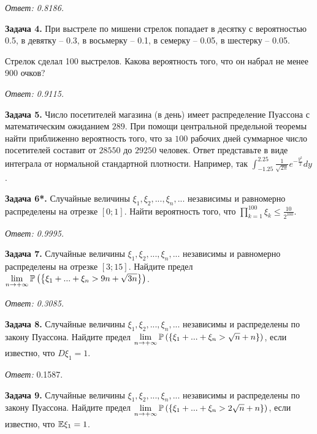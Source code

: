 \textit{Ответ: 0.8186.}

 

\textbf{Задача 4.} При выстреле по мишени стрелок попадает в десятку с вероятностью 0.5, в девятку -- 0.3, в восьмерку -- 0.1, в семерку -- 0.05, в шестерку -- 0.05. 

Стрелок сделал 100 выстрелов. Какова вероятность того, что он набрал не менее 900 очков?

\textit{Ответ: 0.9115.}



\textbf{Задача 5. }Число посетителей магазина (в день) имеет распределение Пуассона с математическим ожиданием $289$. При помощи центральной предельной теоремы найти приближенно вероятность того, что за $100$ рабочих дней суммарное число посетителей составит от $28550$ до $29250$ человек.\textbf{ }Ответ представьте в виде интеграла от нормальной стандартной плотности. Например, так $\int _{-1.25}^{2.25}{\tfrac{1}{\sqrt{2\pi } }} e^{-{\tfrac{y^{2} }{2}} } dy $. 



\textbf{Задача 6*. }Случайные величины $\xi _{1} ,\xi _{2} ,...,\xi _{n} ,...$ независимы и равномерно распределены на отрезке $\left[0;1\right]$. Найти вероятность того, что $\prod _{k=1}^{100}\xi _{k}  \le \frac{10}{2^{100} } $. 

\textit{Ответ: 0.9995.}



\textbf{Задача 7. }Случайные величины $\xi _{1} ,\xi _{2} ,...,\xi _{n} ,...$ независимы и равномерно распределены на отрезке $\left[3;15\right]$. Найдите предел $\mathop{\lim }\limits_{n\to +\infty } {\rm {\mathbb P}}\left(\left\{\xi _{1} +...+\xi _{n} >9n+\sqrt{3n} \right\}\right)$. 

\textit{Ответ: 0.3085.}

 

\textbf{Задача 8. }Случайные величины $\xi _{1} ,\xi _{2} ,...,\xi _{n} ,...$ независимы и распределены по закону Пуассона. Найдите предел $\mathop{\lim }\limits_{n\to +\infty } {\rm {\mathbb P}}\left(\left\{\xi _{1} +...+\xi _{n} >\sqrt{n} +n\right\}\right)$, если известно, что $D\xi _{1} =1$. 

\textit{Ответ: }0.1587.\textit{}

 

\textbf{Задача 9. }Случайные величины $\xi _{1} ,\xi _{2} ,...,\xi _{n} ,...$ независимы и распределены по закону Пуассона. Найдите предел $\mathop{\lim }\limits_{n\to +\infty } {\rm {\mathbb P}}\left(\left\{\xi _{1} +...+\xi _{n} >2\sqrt{n} +n\right\}\right)$, если известно, что ${\rm {\mathbb E}}\xi _{1} =1$. 

